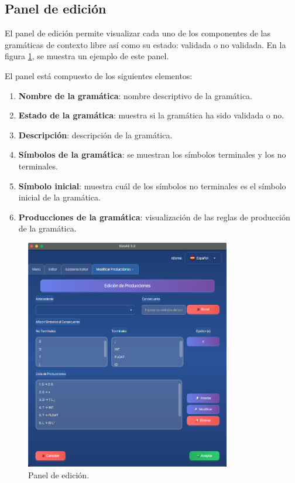 \subsection{Panel de edición}

El panel de edición permite visualizar cada uno de los componentes de las gramáticas de contexto libre así como su estado: validada o no validada. En la figura \ref{fig:d4}, se muestra un ejemplo de este panel.

El panel está compuesto de los siguientes elementos:
\begin{enumerate}
 \item \textbf{Nombre de la gramática}: nombre descriptivo de la gramática.
  \item \textbf{Estado de la gramática}: muestra si la gramática ha sido validada o no.
  \item \textbf{Descripción}: descripción de la gramática.
 \item \textbf{Símbolos de la gramática}: se muestran los símbolos terminales y los no terminales.
 \item \textbf{Símbolo inicial}: muestra cuál de los símbolos no terminales es el símbolo inicial de la gramática.
 \item \textbf{Producciones de la gramática}: visualización de las reglas de producción de la gramática.
 \end{enumerate}

\begin{figure}[htp]
\centering
	\includegraphics[width=0.8\textwidth]{figuras2/editor/panel_producciones.png}
	\caption{Panel de edición.}
	\label{fig:d4}
\end{figure}

